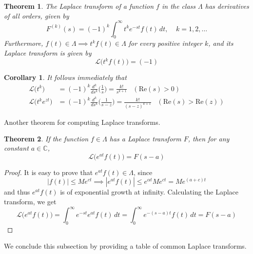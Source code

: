 \documentclass{article}
\newtheorem{theorem}{Theorem}[section]
\newtheorem{corollary}{Corollary}[theorem]
\theoremstyle{remark}
\theoremstyle{definition}
\begin{document}
\begin{theorem}
The Laplace transform of a function $f$ in the class $\Lambda$ has derivatives of all orders, given by
\[F^{(k)} (s) = (-1)^k \int_0^\infty t^k e^{-st} f(t)\,dt, \;\;\;\; k = 1, 2, \ldots\]
Furthermore, $f(t) \in \Lambda \implies t^k f(t) \in \Lambda$ for every positive integer $k$, and its Laplace transform is given by
\[\mathcal{L}\big( t^k f(t) \big) = (-1)\]
\end{theorem}

\begin{corollary}
It follows immediately that
\begin{align*}
    \mathcal{L}\big( t^k\big) & = (-1)^k \frac{d^k}{d s^k} \bigg( \frac{1}{s} \bigg) = \frac{k!}{s^{k+1}} \;\;\; (\text{Re}(s) > 0) \\
    \mathcal{L}\big( t^k e^{zt}\big) & = (-1)^k \frac{d^k}{ds^k} \bigg( \frac{1}{s-z} \bigg) = \frac{k!}{(s-z)^{k+1}} \;\;\; (\text{Re}(s) > \text{Re}(z))
\end{align*}
\end{corollary}

Another theorem for computing Laplace transforms. 

\begin{theorem}
If the function $f \in \Lambda$ has a Laplace transform $F$, then for any constant $a \in \mathbb{C}$, 
\[\mathcal{L}\big(e^{at} f(t) \big) = F(s-a)\]
\end{theorem}
\begin{proof}
It is easy to prove that $e^{at} f(t) \in \Lambda$, since 
\[|f(t)| \leq M e^{ct} \implies |e^{at} f(t)| \leq e^{\alpha t} M e^{ct} = M e^{(a+c)t}\]
and thus $e^{at} f(t)$ is of exponential growth at infinity. Calculating the Laplace transform, we get
\[\mathcal{L}\big(e^{at} f(t) \big) = \int_0^\infty e^{-st} e^{at} f(t) \,dt = \int_0^\infty e^{-(s-a)t} f(t) \,dt = F(s - a)\]
\end{proof}

We conclude this subsection by providing a table of common Laplace transforms. 
\end{document}
